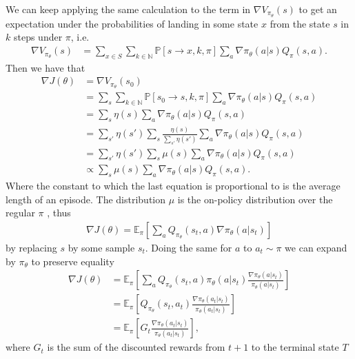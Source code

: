 We can keep applying the same calculation to the term in $\nabla
V_{\pi_\theta}(s)$ to get an expectation under the probabilities of landing
in some state $x$ from the state $s$ in $k$ steps under $\pi$, i.e.
\begin{align}
    \nabla V_{\pi_\theta}(s)
    &= \sum_{x\in S}\sum_{k \in \mathbb{N} }\mathbb{P}[s\rightarrow x, k,
    \pi]   \sum_{a} \nabla \pi_\theta(a|s)Q_{\pi}(s,a).
\end{align}
Then we have that
\begin{align}
    \nabla J(\theta)
    &= \nabla V_{\pi_\theta}(s_0)\\
    &= \sum_{s}\sum_{k \in \mathbb{N} }\mathbb{P}[s_0\rightarrow s, k,
    \pi]   \sum_{a} \nabla \pi_\theta(a|s)Q_{\pi}(s,a)\\
    &= \sum_{s}\eta(s)  \sum_{a} \nabla \pi_\theta(a|s)Q_{\pi}(s,a)\\
    &= \sum_{s'}\eta(s') \sum_{s} \frac{\eta(s)}{\sum_{s'}\eta(s') }
    \sum_{a} \nabla \pi_\theta(a|s)Q_{\pi}(s,a)\\
    &= \sum_{s'}\eta(s')\sum_{s}\mu(s)\sum_{a} \nabla
    \pi_\theta(a|s)Q_{\pi}(s,a)\\
    &\propto \sum_{s}\mu(s)\sum_{a} \nabla
    \pi_\theta(a|s)Q_{\pi}(s,a).
\end{align}
Where the constant to which the last equation is proportional to is the
average length of an episode. The distribution $\mu$ is the on-policy
distribution over the regular $\pi$ \cite[Chapter~9,10]{sutton_barto}, thus
\begin{align}
    \nabla J(\theta) = \mathbb{E}_\pi\left[
        \sum_{a}Q_{\pi_{\theta}}(s_t, a)\nabla\pi_\theta(a|s_t)
    \right]
\end{align}
by replacing $s$ by some sample $s_t$. Doing the same for $a$ to $a_t \sim
\pi$ we can expand by $\pi_\theta$ to preserve equality
\begin{align}
    \nabla J(\theta)
    &= \mathbb{E}_\pi\left[
        \sum_{a}Q_{\pi_{\theta}}(s_t,
        a) \pi_\theta(a|s_t)\frac{\nabla\pi_\theta(a|s_t)}{\pi_\theta (a| s_t)}
    \right]\\
    &= \mathbb{E}_\pi\left[
        Q_{\pi_{\theta}}(s_t,
        a_t) \frac{\nabla\pi_\theta(a_t|s_t)}{\pi_\theta(a_t|s_t)}
    \right]\\
    &= \mathbb{E}_\pi\left[
        G_t \frac{\nabla\pi_\theta(a_t|s_t)}{\pi_\theta(a_t|s_t)}
    \right],
\end{align}
where $G_t$ is the sum of the discounted rewards from $t+1$ to the terminal state $T$
